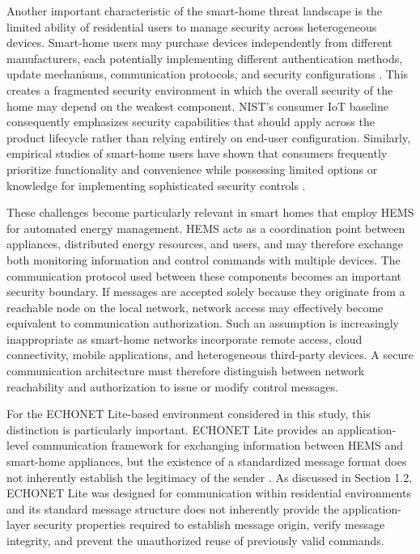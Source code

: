 Another important characteristic of the smart-home threat landscape is the limited ability of residential users to manage security across heterogeneous devices. Smart-home users may purchase devices independently from different manufacturers, each potentially implementing different authentication methods, update mechanisms, communication protocols, and security configurations \citep{faganProfileIoTCore2022,haneySmartHomeSecurity2020,almaniAssessingSecurityVulnerabilities2025}. This creates a fragmented security environment in which the overall security of the home may depend on the weakest component. NIST's consumer IoT baseline consequently emphasizes security capabilities that should apply across the product lifecycle rather than relying entirely on end-user configuration. Similarly, empirical studies of smart-home users have shown that consumers frequently prioritize functionality and convenience while possessing limited options or knowledge for implementing sophisticated security controls \citep{faganProfileIoTCore2022,haneySmartHomeSecurity2020}.

These challenges become particularly relevant in smart homes that employ HEMS for automated energy management. HEMS acts as a coordination point between appliances, distributed energy resources, and users, and may therefore exchange both monitoring information and control commands with multiple devices. The communication protocol used between these components becomes an important security boundary. If messages are accepted solely because they originate from a reachable node on the local network, network access may effectively become equivalent to communication authorization. Such an assumption is increasingly inappropriate as smart-home networks incorporate remote access, cloud connectivity, mobile applications, and heterogeneous third-party devices. A secure communication architecture must therefore distinguish between network reachability and authorization to issue or modify control messages.

For the ECHONET Lite-based environment considered in this study, this distinction is particularly important. ECHONET Lite provides an application-level communication framework for exchanging information between HEMS and smart-home appliances, but the existence of a standardized message format does not inherently establish the legitimacy of the sender \citep{ECHONETPart2,eissaDevelopingIncentiveDemand2019}. As discussed in Section 1.2, ECHONET Lite was designed for communication within residential environments and its standard message structure does not inherently provide the application-layer security properties required to establish message origin, verify message integrity, and prevent the unauthorized reuse of previously valid commands.

